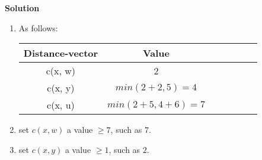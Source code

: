 \documentclass[12pt,letterpaper]{ctexart}
\begin{document}
{\bf Solution}

\begin{enumerate}
  \item As follows:
  \begin{table}[htbp]
    \small
    \centering
    \begin{tabular}{|c|c|c|c|c|c|c|}
    \hline
    Distance-vector  & Value \\ \hline
         c(x, w)     &  2    \\ \hline
         c(x, y)     &  $min(2 + 2, 5) = 4$ \\ \hline
         c(x, u)     &  $min(2 + 5, 4 + 6) = 7$  \\ \hline
    \end{tabular}
  \end{table}
  \item set $c(x, w)$ a value $\geq 7$, such as $7$.
  \item set $c(x, y)$ a value $\geq 1$, such as $2$.
\end{enumerate}
\end{document}
